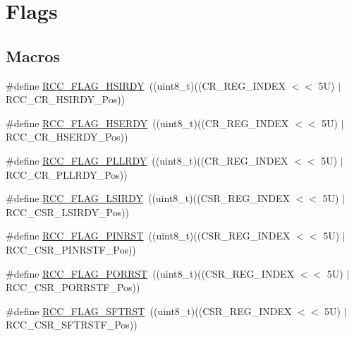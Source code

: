 \hypertarget{group___r_c_c___flag}{}\section{Flags}
\label{group___r_c_c___flag}
\subsection*{Macros}
\begin{DoxyCompactItemize}
\item 
\#define \hyperlink{group___r_c_c___flag_ga827d986723e7ce652fa733bb8184d216}{R\+C\+C\+\_\+\+F\+L\+A\+G\+\_\+\+H\+S\+I\+R\+DY}~((uint8\+\_\+t)((C\+R\+\_\+\+R\+E\+G\+\_\+\+I\+N\+D\+EX $<$$<$ 5\+U) $\vert$ R\+C\+C\+\_\+\+C\+R\+\_\+\+H\+S\+I\+R\+D\+Y\+\_\+\+Pos))
\item 
\#define \hyperlink{group___r_c_c___flag_ga173edf47bec93cf269a0e8d0fec9997c}{R\+C\+C\+\_\+\+F\+L\+A\+G\+\_\+\+H\+S\+E\+R\+DY}~((uint8\+\_\+t)((C\+R\+\_\+\+R\+E\+G\+\_\+\+I\+N\+D\+EX $<$$<$ 5\+U) $\vert$ R\+C\+C\+\_\+\+C\+R\+\_\+\+H\+S\+E\+R\+D\+Y\+\_\+\+Pos))
\item 
\#define \hyperlink{group___r_c_c___flag_gaf82d8afb18d9df75db1d6c08b9c50046}{R\+C\+C\+\_\+\+F\+L\+A\+G\+\_\+\+P\+L\+L\+R\+DY}~((uint8\+\_\+t)((C\+R\+\_\+\+R\+E\+G\+\_\+\+I\+N\+D\+EX $<$$<$ 5\+U) $\vert$ R\+C\+C\+\_\+\+C\+R\+\_\+\+P\+L\+L\+R\+D\+Y\+\_\+\+Pos))
\item 
\#define \hyperlink{group___r_c_c___flag_ga8c5e4992314d347597621bfe7ab10d72}{R\+C\+C\+\_\+\+F\+L\+A\+G\+\_\+\+L\+S\+I\+R\+DY}~((uint8\+\_\+t)((C\+S\+R\+\_\+\+R\+E\+G\+\_\+\+I\+N\+D\+EX $<$$<$ 5\+U) $\vert$ R\+C\+C\+\_\+\+C\+S\+R\+\_\+\+L\+S\+I\+R\+D\+Y\+\_\+\+Pos))
\item 
\#define \hyperlink{group___r_c_c___flag_gabfc3ab5d4a8a94ec1c9f38794ce37ad6}{R\+C\+C\+\_\+\+F\+L\+A\+G\+\_\+\+P\+I\+N\+R\+ST}~((uint8\+\_\+t)((C\+S\+R\+\_\+\+R\+E\+G\+\_\+\+I\+N\+D\+EX $<$$<$ 5\+U) $\vert$ R\+C\+C\+\_\+\+C\+S\+R\+\_\+\+P\+I\+N\+R\+S\+T\+F\+\_\+\+Pos))
\item 
\#define \hyperlink{group___r_c_c___flag_ga39ad309070f416720207eece5da7dc2c}{R\+C\+C\+\_\+\+F\+L\+A\+G\+\_\+\+P\+O\+R\+R\+ST}~((uint8\+\_\+t)((C\+S\+R\+\_\+\+R\+E\+G\+\_\+\+I\+N\+D\+EX $<$$<$ 5\+U) $\vert$ R\+C\+C\+\_\+\+C\+S\+R\+\_\+\+P\+O\+R\+R\+S\+T\+F\+\_\+\+Pos))
\item 
\#define \hyperlink{group___r_c_c___flag_gaf7852615e9b19f0b2dbc8d08c7594b52}{R\+C\+C\+\_\+\+F\+L\+A\+G\+\_\+\+S\+F\+T\+R\+ST}~((uint8\+\_\+t)((C\+S\+R\+\_\+\+R\+E\+G\+\_\+\+I\+N\+D\+EX $<$$<$ 5\+U) $\vert$ R\+C\+C\+\_\+\+C\+S\+R\+\_\+\+S\+F\+T\+R\+S\+T\+F\+\_\+\+Pos))
$$
\end{DoxyCompactItemize}
